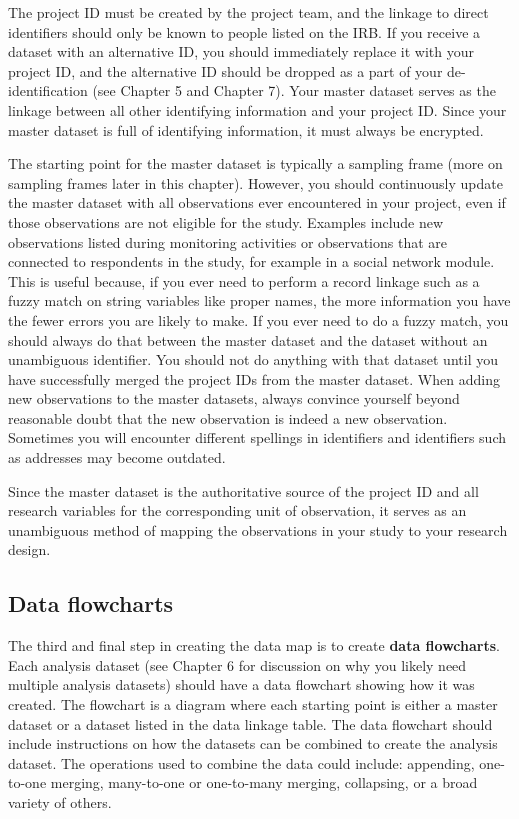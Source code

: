 The project ID must be created by the project team,
and the linkage to direct identifiers
should only be known to people listed on the IRB.
If you receive a dataset with an alternative ID,
you should immediately replace it with your project ID,
and the alternative ID should be dropped
as a part of your de-identification (see Chapter 5 and Chapter 7).
Your master dataset serves as the linkage between
all other identifying information and your project ID.
Since your master dataset is full of identifying information,
it must always be encrypted.

The starting point for the master dataset is typically a sampling frame
(more on sampling frames later in this chapter).
However, you should continuously update the master dataset with
all observations ever encountered in your project,
even if those observations are not eligible for the study.
Examples include new observations listed during monitoring activities
or observations that are connected to respondents in the study,
for example in a social network module.
This is useful because,
if you ever need to perform a record linkage such as a fuzzy match
on string variables like proper names,
the more information you have the fewer errors you are likely to make.
If you ever need to do a fuzzy match,
you should always do that between the master dataset
and the dataset without an unambiguous identifier.
You should not do anything with that dataset until
you have successfully merged
the project IDs from the master dataset.
When adding new observations to the master datasets,
always convince yourself beyond reasonable doubt
that the new observation is indeed a new observation.
Sometimes you will encounter different spellings in identifiers
and identifiers such as addresses may become outdated.

Since the master dataset is the authoritative source
of the project ID and all research variables
for the corresponding unit of observation,
it serves as an unambiguous method of mapping
the observations in your study to your research design.

\subsection{Data flowcharts}

The third and final step in creating the data map is
to create \textbf{data flowcharts}.
Each analysis dataset
(see Chapter 6 for discussion on why you likely need multiple analysis datasets)
should have a data flowchart showing how it was created.
The flowchart is a diagram
where each starting point is either a master dataset
or a dataset listed in the data linkage table.
The data flowchart should include instructions on how
the datasets can be combined to create the analysis dataset.
The operations used to combine the data could include:
appending, one-to-one merging,
many-to-one or one-to-many merging, collapsing, or a broad variety of others.

